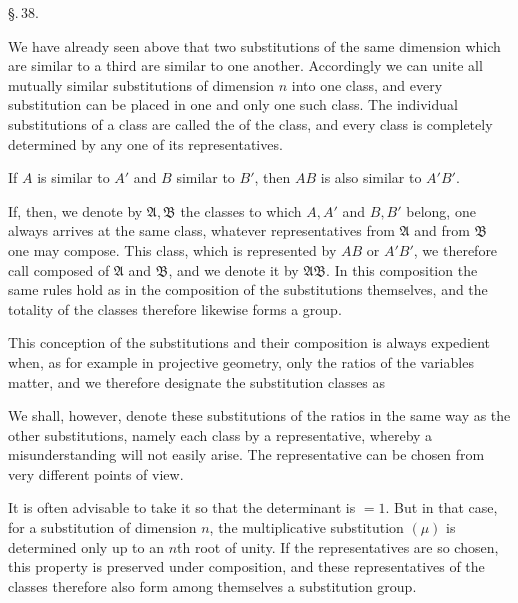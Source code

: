 
\begin{center}
\S.\,38.

\end{center}

We have already seen above that two substitutions of the same dimension which are similar to a third are similar to one another. Accordingly we can unite all mutually similar substitutions of dimension $n$ into one class, and every substitution can be placed in one and only one such class. The individual substitutions of a class are called the  of the class, and every class is completely determined by any one of its representatives.

If $A$ is similar to $A'$ and $B$ similar to $B'$, then $AB$ is also similar to $A'B'$.

If, then, we denote by $\mathfrak{A}, \mathfrak{B}$ the classes to which $A, A'$ and $B, B'$ belong, one always arrives at the same class, whatever representatives from $\mathfrak{A}$ and from $\mathfrak{B}$ one may compose. This class, which is represented by $AB$ or $A'B'$, we therefore call composed of $\mathfrak{A}$ and $\mathfrak{B}$, and we denote it by $\mathfrak{A}\mathfrak{B}$. In this composition the same rules hold as in the composition of the substitutions themselves, and the totality of the classes therefore likewise forms a group.

This conception of the substitutions and their composition is always expedient when, as for example in projective geometry, only the ratios of the variables matter, and we therefore designate the substitution classes as 

We shall, however, denote these substitutions of the ratios in the same way as the other substitutions, namely each class by a representative, whereby a misunderstanding will not easily arise. The representative can be chosen from very different points of view.

It is often advisable to take it so that the determinant is $= 1$. But in that case, for a substitution of dimension $n$, the multiplicative substitution $(\mu)$ is determined only up to an $n$th root of unity. If the representatives are so chosen, this property is preserved under composition, and these representatives of the classes therefore also form among themselves a substitution group.
